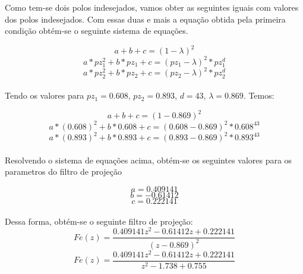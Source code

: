 \documentclass[a4paper,12pt]{article}
\begin{document}
Como tem-se dois polos indesejados, vamos obter as seguintes iguais com valores dos polos indesejados. Com essas duas e mais a equação obtida pela primeira condição obtém-se o seguinte sistema de equações.

\begin{equation}
a + b + c = (1 - \lambda)^2
\end{equation}
\begin{equation}
a * pz^2_1 + b * pz_1 + c = (pz_1 - \lambda)^2 * pz^d_1
\end{equation}
\begin{equation}
a * pz^2_2 + b * pz_2 + c = (pz_2 - \lambda)^2 * pz^d_2
\end{equation}\\


Tendo os valores para $pz_1 = 0.608$, $pz_2 = 0.893$, $d = 43$, $\lambda = 0.869$. Temos:


\begin{equation}
a + b + c = (1 - 0.869)^2
\end{equation}
\begin{equation}
a * (0.608)^2 + b * 0.608  + c = (0.608 - 0.869)^2 * 0.608^{43}
\end{equation}
\begin{equation}
a * (0.893)^2 + b * 0.893  + c = (0.893 - 0.869)^2 * 0.893^{43}
\end{equation}\\

Resolvendo o sistema de equações acima, obtém-se os seguintes valores para os parametros do filtro de projeção

\begin{equation}
a =  0.409141
\end{equation}
\begin{equation}
b = -0.61412
\end{equation}
\begin{equation}
c = 0.222141
\end{equation}\\

Dessa forma, obtém-se o seguinte filtro de projeção:\\

\begin{equation}
Fe(z) = \frac{0.409141z^2 - 0.61412z + 0.222141}{(z-0.869)^2}
\end{equation}
\begin{equation}
Fe(z) = \frac{0.409141z^2 - 0.61412z + 0.222141}{z^2 - 1.738 + 0.755}
\end{equation}\\
\end{document}
